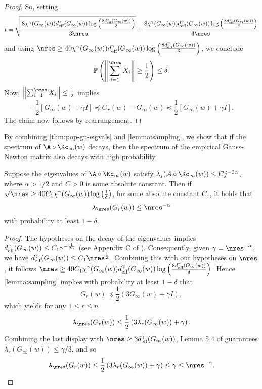 \begin{proof}
    So, setting 
    \[
    t = \sqrt{\frac{8\chi^\gamma(G_{\infty}(w))d^{\gamma}_{\textup{eff}}(G_{\infty}(w))\log\left(\frac{8d^{\gamma}_{\textup{eff}}(G_{\infty}(w))}{\delta}\right)}{3\nres}}+\frac{8\chi^\gamma(G_{\infty}(w))d^{\gamma}_{\textup{eff}}(G_{\infty}(w))\log\left(\frac{8d^{\gamma}_{\textup{eff}}(G_{\infty}(w))}{\delta}\right)}{3\nres}
    \]
    and using $\nres\geq 40\chi^\gamma(G_{\infty}(w)) d^{\gamma}_{\textup{eff}}(G_{\infty}(w))\log\left(\frac{8d^{\gamma}_{\textup{eff}}(G_{\infty}(w))}{\delta}\right)$, we conclude
    \[\mathbb P\left(\left\|\sum_{i=1}^{\nres}X_i\right\|\geq \frac{1}{2}\right)\leq \delta.\]
    Now, $\left\|\sum_{i=1}^{\nres}X_i\right\|\leq \frac{1}{2}$ implies
    \[
    -\frac{1}{2}\left[G_{\infty}(w)+\gamma I\right]\preceq G_r(w)-G_{\infty}(w)\preceq \frac{1}{2}\left[G_{\infty}(w)+\gamma I\right].
    \]
    The claim now follows by rearrangement. 
\end{proof}

By combining \cref{thm:pop-gn-eigvals} and \cref{lemma:sampling}, we show that if the spectrum of $\A\circ \Kc_{\infty}(w)$ decays, then the spectrum of the empirical Gauss-Newton matrix also decays with high probability.  
\begin{proposition}
\label{prop:emp_gn_spectrum}
Suppose the eigenvalues of $\A\circ \Kc_{\infty}(w)$ satisfy $\lambda_j(\mathcal A\circ \Kc_{\infty}(w))\leq Cj^{-2\alpha}$, where $\alpha>1/2$ and $C>0$ is some absolute constant.
Then if $\sqrt{\nres}\geq 40C_1\chi^{\gamma}(G_{\infty}(w))\log\left(\frac{1}{\delta}\right)$, for some absolute constant $C_1$, it holds that
\[
  \lambda_{\nres}(G_r(w))\leq \nres^{-\alpha}
\]
with probability at least $1-\delta$.
         
\end{proposition}
\begin{proof} 
    The hypotheses on the decay of the eigenvalues implies $d^{\gamma}_{\textup{eff}}(G_{\infty}(w)) \leq C_1\gamma^{-\frac{1}{2\alpha}}$ (see Appendix C of \citet{bach2013sharp}).
    Consequently, given $\gamma = \nres^{-\alpha}$, we have $d^{\gamma}_{\textup{eff}}(G_{\infty}(w)) \leq C_1\nres^{\frac{1}{2}}$. 
    Combining this with our hypotheses on $\nres$, it follows $\nres\geq 40 C_1\chi^{\gamma}(G_{\infty}(w))d^{\gamma}_{\textup{eff}}(G_{\infty}(w))\log\left(\frac{8d^{\gamma}_{\textup{eff}}(G_{\infty}(w))}{\delta}\right)$.
    Hence \cref{lemma:sampling} implies with probability at least $1-\delta$ that 
    \[
    G_r(w)\preceq \frac{1}{2}\left(3 G_\infty(w)+\gamma I\right),
    \]
    which yields for any $1\leq r\leq n$
    \[
    \lambda_{\nres}(G_r(w))\leq \frac{1}{2}\left(3\lambda_r(G_\infty(w))+\gamma\right).
    \]
    Combining the last display with $\nres\geq 3d^{\gamma}_{\textup{eff}}(G_{\infty}(w))$, 
    Lemma 5.4 of \citet{frangella2023randomized} guarantees $\lambda_r(G_\infty(w))\leq \gamma/3$, and so 
    \[
    \lambda_{\nres}(G_r(w))\leq \frac{1}{2}\left(3\lambda_r(G_\infty(w))+\gamma\right)\leq \gamma \leq \nres^{-\alpha}.
    \]
\end{proof}

